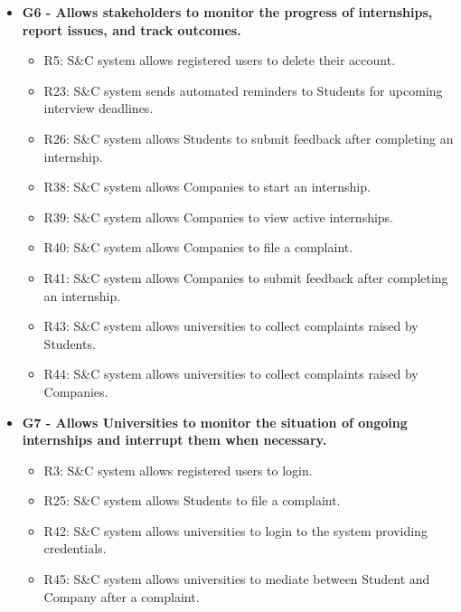 \begin{itemize}
\begin{itemize}
    \end{itemize}
    \item \textbf{G6 - Allows stakeholders to monitor the progress of internships, report issues, and track outcomes.}
    \begin{itemize}
        \item R5: S\&C system allows registered users to delete their account.
        \item R23: S\&C system sends automated reminders to Students for upcoming interview deadlines.
        \item R26: S\&C system allows Students to submit feedback after completing an internship.
        \item R38: S\&C system allows Companies to start an internship.
        \item R39: S\&C system allows Companies to view active internships.
        \item R40: S\&C system allows Companies to file a complaint.
        \item R41: S\&C system allows Companies to submit feedback after completing an internship.
        \item R43: S\&C system allows universities to collect complaints raised by Students.
        \item R44: S\&C system allows universities to collect complaints raised by Companies.
    \end{itemize}

    
    \item \textbf{G7 - Allows Universities to monitor the situation of ongoing internships and interrupt them when necessary.}
    \begin{itemize}
        \item R3: S\&C system allows registered users to login.
        \item R25: S\&C system allows Students to file a complaint.
        \item R42: S\&C system allows universities to login to the system providing credentials.
        \item R45: S\&C system allows universities to mediate between Student and Company after a complaint.
    \end{itemize}
\end{itemize}

\clearpage

